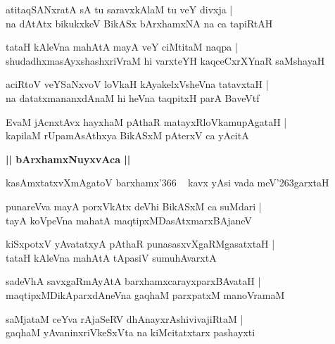 \documentclass[twoside,12pt,openright]{book}
\def\S{\char'263}
\newcounter{shloka}[chapter]
\def\uvaca#1{\centerline{{\large\textbf{#1}}}}
\begin{document}
\begin{shloka}%
atitaqSANxratA sA tu saravxkAlaM tu veY divxja |\\
na dAtAtx bikukxkeV BikASx bArxhamxNA na ca tapiRtAH
\end{shloka}

\begin{shloka}%
tataH kAleVna mahAtA mayA veY ciMtitaM naqpa |\\
shudadhxmasAyxshashxriVraM hi varxteYH kaqceCxrXYnaR saMshayaH
\end{shloka}

\begin{shloka}%
aciRtoV veYSaNxvoV loVkaH kAyakelxVsheVna tatavxtaH |\\
na datatxmananxdAnaM hi heVna taqpitxH parA BaveVtf
\end{shloka}

\begin{shloka}%
EvaM jAcnxtAvx hayxhaM pAthaR matayxRloVkamupAgataH |\\
kapilaM rUpamAsAthxya BikASxM pAterxV ca yAcitA
\end{shloka}

\uvaca{|| bArxhamxNuyxvAca ||}

\begin{shloka}%
kasAmxtatxvXmAgatoV barxhamx\char'366 ~ kavx yAsi vada meV\S garxtaH 
\end{shloka}

\begin{shloka}%
punareVva mayA porxVkAtx deVhi BikASxM ca suMdari |\\
tayA koVpeVna mahatA maqtipxMDasAtxmarxBAjaneV 
\end{shloka}

\begin{shloka}%
kiSxpotxV yAvatatxyA pAthaR punasasxvXgaRMgasatxtaH |\\
tataH kAleVna mahAtA tApasiV sumuhAvarxtA
\end{shloka}

\begin{shloka}%
sadeVhA savxgaRmAyAtA barxhamxcarayxparxBAvataH |\\
maqtipxMDikAparxdAneVna gaqhaM parxpatxM manoVramaM 
\end{shloka}

\begin{shloka}%
saMjataM ceYva rAjaSeRV dhAnayxrAshivivajiRtaM |\\
gaqhaM yAvaninxriVkeSxVta na kiMcitatxtarx pashayxti
\end{shloka}
\end{document}
